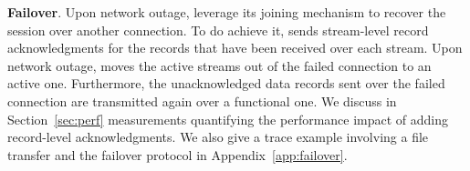 \textbf{Failover}. 
Upon network outage, \tcpls leverage its joining mechanism to recover the session
over another \tcp connection. To do achieve it, \tcpls sends stream-level record
acknowledgments for the records that have been received
over each stream. Upon network outage, \tcpls moves the
active streams out of the failed \tcp connection to an active one. Furthermore,
the unacknowledged data records sent over the failed \tcp connection are
transmitted again over a functional one.
We discuss in Section~\ref{sec:perf} measurements quantifying the
performance impact of adding \tcpls record-level acknowledgments. We also give a
trace example involving a file transfer and the failover protocol in
Appendix~\ref{app:failover}.


